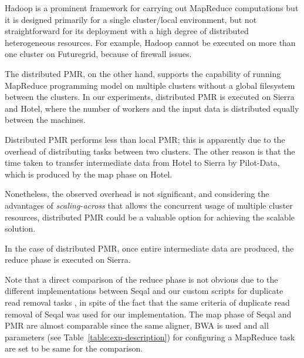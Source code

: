 \documentclass{acm_proc_article-sp}
\begin{document}
Hadoop is a prominent framework for carrying out MapReduce computations but it is
designed primarily for a single cluster/local environment, but not straightforward for its deployment with a high degree of distributed heterogeneous resources.  For example, Hadoop cannot be executed on more than one cluster on Futuregrid, because of firewall issues. 

The distributed PMR, on the other hand, supports the capability of running
MapReduce programming model on multiple clusters without a global filesystem between the clusters.  In our experiments, distributed PMR is executed on Sierra and Hotel, where the number of workers and the input data is distributed equally between the machines.

Distributed PMR performs less than local PMR; this is apparently due to the overhead of
distributing tasks between two clusters.  The other reason is that the time taken to transfer intermediate data from Hotel to Sierra by Pilot-Data, which is produced by the map phase on Hotel.

Nonetheless, the observed overhead is not significant, and considering the advantages of
\textit{scaling-across} that allows the concurrent usage of multiple cluster resources, distributed PMR could be a valuable option for achieving the scalable solution.   

In the case of distributed PMR, once entire intermediate data are produced, the reduce phase is executed on Sierra. 

Note that a direct comparison of the reduce phase is not obvious due to the different implementations between Seqal and our custom scripts for duplicate read removal tasks , in spite of the fact that the same
criteria of duplicate read removal of Seqal\cite{seal_2011_mapred} was
used for our implementation.  The map phase of Seqal and PMR are almost comparable since
the same aligner, BWA is used and all parameters (see
Table~\ref{table:exp-description}) for configuring a MapReduce task
are set to be same for the comparison.

\end{document}
